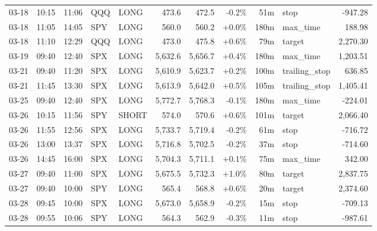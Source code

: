 \documentclass[11pt,a4paper,twoside]{article}
\begin{document}
\begin{center}
\begin{longtable}{>{\color{txtmain}}l l l l l r r r r >{\color{txtmain}}l r}
03-18 & 10:15 & 11:06 & QQQ & LONG & 473.6 & 472.5 & \textcolor{lossred}{-0.2\%} & 51m & stop & \textcolor{lossred}{-947.28} \\
03-18 & 11:05 & 14:05 & SPY & LONG & 560.0 & 560.2 & \textcolor{wingreen}{+0.0\%} & 180m & max\_time & \textcolor{wingreen}{188.98} \\
03-18 & 11:10 & 12:29 & QQQ & LONG & 473.0 & 475.8 & \textcolor{wingreen}{+0.6\%} & 79m & target & \textcolor{wingreen}{2,270.30} \\
03-19 & 09:40 & 12:40 & SPX & LONG & 5,632.6 & 5,656.7 & \textcolor{wingreen}{+0.4\%} & 180m & max\_time & \textcolor{wingreen}{1,203.51} \\
03-21 & 09:40 & 11:20 & SPX & LONG & 5,610.9 & 5,623.7 & \textcolor{wingreen}{+0.2\%} & 100m & trailing\_stop & \textcolor{wingreen}{636.85} \\
03-21 & 11:45 & 13:30 & SPX & LONG & 5,613.9 & 5,642.0 & \textcolor{wingreen}{+0.5\%} & 105m & trailing\_stop & \textcolor{wingreen}{1,405.41} \\
03-25 & 09:40 & 12:40 & SPX & LONG & 5,772.7 & 5,768.3 & \textcolor{lossred}{-0.1\%} & 180m & max\_time & \textcolor{lossred}{-224.01} \\
03-26 & 10:15 & 11:56 & SPY & SHORT & 574.0 & 570.6 & \textcolor{wingreen}{+0.6\%} & 101m & target & \textcolor{wingreen}{2,066.40} \\
03-26 & 11:55 & 12:56 & SPX & LONG & 5,733.7 & 5,719.4 & \textcolor{lossred}{-0.2\%} & 61m & stop & \textcolor{lossred}{-716.72} \\
03-26 & 13:00 & 13:37 & SPX & LONG & 5,716.8 & 5,702.5 & \textcolor{lossred}{-0.2\%} & 37m & stop & \textcolor{lossred}{-714.60} \\
03-26 & 14:45 & 16:00 & SPX & LONG & 5,704.3 & 5,711.1 & \textcolor{wingreen}{+0.1\%} & 75m & max\_time & \textcolor{wingreen}{342.00} \\
03-27 & 09:40 & 11:00 & SPX & LONG & 5,675.5 & 5,732.3 & \textcolor{wingreen}{+1.0\%} & 80m & target & \textcolor{wingreen}{2,837.75} \\
03-27 & 09:40 & 10:00 & SPY & LONG & 565.4 & 568.8 & \textcolor{wingreen}{+0.6\%} & 20m & target & \textcolor{wingreen}{2,374.60} \\
03-28 & 09:45 & 10:00 & SPX & LONG & 5,673.0 & 5,658.9 & \textcolor{lossred}{-0.2\%} & 15m & stop & \textcolor{lossred}{-709.13} \\
03-28 & 09:55 & 10:06 & SPY & LONG & 564.3 & 562.9 & \textcolor{lossred}{-0.3\%} & 11m & stop & \textcolor{lossred}{-987.61} \\

\end{longtable}
\end{center}
\end{document}
